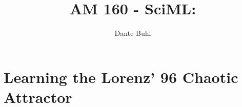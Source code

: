\documentclass{article}
\begin{document}
\title{AM 160 - SciML:}
\author{Dante Buhl}


\newcommand{\wrms}{w_{\text{rms}}}
\newcommand{\bs}[1]{\boldsymbol{#1}}
\newcommand{\tb}[1]{\textbf{#1}}
\newcommand{\bmp}[1]{\begin{minipage}{#1\textwidth}}
\newcommand{\emp}{\end{minipage}}
\newcommand{\R}{\mathbb{R}}
\newcommand{\C}{\mathbb{C}}
\newcommand{\N}{\mathcal{N}}
\newcommand{\K}{\bs{\mathrm{K}}}
\newcommand{\m}{\bs{\mu}_*}
\newcommand{\s}{\bs{\Sigma}_*}
\newcommand{\dt}{\Delta t}
\newcommand{\dx}{\Delta x}
\newcommand{\tr}[1]{\text{Tr}(#1)}
\newcommand{\Tr}[1]{\text{Tr}(#1)}
\newcommand{\Div}{\nabla \cdot}
\renewcommand{\div}{\nabla \cdot}
\newcommand{\Curl}{\nabla \times}
\newcommand{\Grad}{\nabla}
\newcommand{\grad}{\nabla}
\newcommand{\grads}{\nabla_s}
\newcommand{\gradf}{\nabla_f}
\newcommand{\xs}{x_s}
\newcommand{\xf}{x_f}
\newcommand{\ts}{t_s}
\newcommand{\tf}{t_f}
\newcommand{\pt}{\partial t}
\newcommand{\pz}{\partial z}
\newcommand{\uvec}{\bs{u}}
\newcommand{\F}{\bs{F}}
\newcommand{\T}{\tilde{T}}
\newcommand{\ez}{\bs{e}_z}
\newcommand{\ex}{\bs{e}_x}
\newcommand{\ey}{\bs{e}_y}
\newcommand{\eo}{\bs{e}_{\bs{\Omega}}}
\newcommand{\ppt}[1]{\frac{\partial #1}{\partial t}}
\newcommand{\DDt}[1]{\frac{D #1}{D t}}
\newcommand{\ppts}[1]{\frac{\partial #1}{\partial t_s}}
\newcommand{\pptf}[1]{\frac{\partial #1}{\partial t_f}}
\newcommand{\ppz}[1]{\frac{\partial #1}{\partial z}}
\newcommand{\pp}[2]{\frac{\partial #1}{\partial #2}}
\newcommand{\dd}[2]{\frac{d #1}{d #2}}
\newcommand{\ddz}[1]{\frac{d #1}{d z}}
\newcommand{\ppzetas}[1]{\frac{\partial^2 #1}{\partial \zeta^2}}
\newcommand{\ppzs}[1]{\frac{\partial #1}{\partial z_s}}
\newcommand{\ppzf}[1]{\frac{\partial #1}{\partial z_f}}
\newcommand{\ppx}[1]{\frac{\partial #1}{\partial x}}
\newcommand{\ppxi}[1]{\frac{\partial #1}{\partial x_i}}
\newcommand{\ppxj}[1]{\frac{\partial #1}{\partial x_j}}
\newcommand{\ppy}[1]{\frac{\partial #1}{\partial y}}
\newcommand{\ppzeta}[1]{\frac{\partial #1}{\partial \zeta}}


\maketitle 
\setlength{\parindent}{0pt}
\doublespacing

\section{Learning the Lorenz' 96 Chaotic Attractor}
\end{document}
